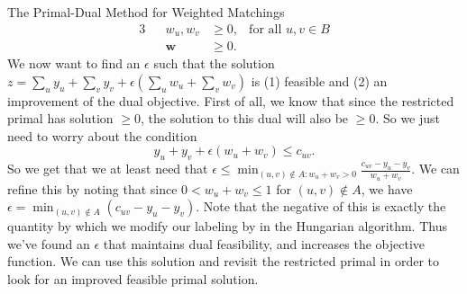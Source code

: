 \begin{section}{The Primal-Dual Method for Weighted Matchings}
\begin{alignat}{3}
				     && w_u,w_v & \geq 0, & \text{for all } u,v\in B \\
				     && \mathbf{w} & \geq 0.
	\end{alignat}
	We now want to find an $\epsilon$ such that the solution $z = \sum_u y_u + \sum_v y_v + 
	\epsilon (\sum_u w_u + \sum_v w_v)$ is (1) feasible and (2) an improvement of the dual 
	objective. First of all, we know that since the restricted primal has solution $\geq 0$, 
	the solution to this dual will also be $\geq 0$. So we just need to worry about the condition 
	\[
		y_u + y_v + \epsilon (w_u + w_v) \leq c_{uv}.
	\]
	So we get that we at least need that $\epsilon \leq \min_{(u,v)\notin A: w_u + w_v > 0}
	\frac{c_{uv} - y_u - y_v}{w_u + w_v}$. We can refine this by noting that since 
	$0 < w_u + w_v \leq 1$ for $(u,v)\notin A$, we have $\epsilon = \min_{(u,v)\notin A} 
	(c_{uv} - y_u - y_v)$. Note that the negative of this is exactly the quantity by which we 
	modify our labeling by in the Hungarian algorithm. Thus we've found an 
	$\epsilon$ that maintains dual feasibility, and increases the objective function. We can use 
	this solution and revisit the restricted primal in order to look for an improved feasible 
	primal solution.
\end{section}

